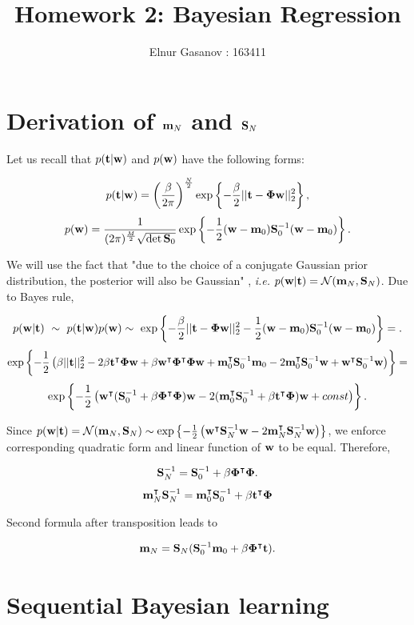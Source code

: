 \documentclass{article}
\author{Elnur Gasanov : 163411}
\title{Homework 2: Bayesian Regression}
\newcommand{\mm}{\bold{m}}
\newcommand{\mS}{\bold{S}}
\newcommand{\mPhi}{\bold{\Phi}}
\newcommand{\mw}{\bold{w}}
\newcommand{\mt}{\bold{t}}
\begin{document}
\maketitle

\section{Derivation of $\mm_N$ and $\mS_N$}

Let us recall that $p (\mt |\mw)$ and $p(\mw)$ have the following forms:

$$
p (\mt |\mw) = \left(\frac{\beta}{2 \pi} \right)^\frac{N}{2} \exp \left\{- \frac\beta2 ||\mt - \mPhi\mw||^2_2 \right\}, 
$$
$$
p(\mw) = \frac{1}{(2\pi)^{\frac{M}{2}} \sqrt{\det \mS_0}} \exp \left\{ -\frac12 (\mw - \mm_0) \mS_0^{-1} (\mw - \mm_0) \right\}.
$$

We will use the fact that "due to the choice of a conjugate Gaussian prior distribution, the posterior will also be Gaussian" \cite{bishop}, \textit{i.e.} $p(\mw |\mt) = \mathcal{N}(\mm_N, \mS_N)$. Due to Bayes rule, 

$$
p(\mw |\mt)~\sim~p(\mt|\mw) p(\mw) \sim \ \exp \left\{- \frac\beta2 ||\mt - \mPhi\mw||^2_2 -\frac12 (\mw - \mm_0) \mS_0^{-1} (\mw - \mm_0) \right\} = .
$$
$$
\exp \left\{ -\frac12 \left(\beta ||\mt||^2_2 - 2 \beta \mt^\intercal \mPhi \mw + \beta \mw^\intercal \mPhi^\intercal \mPhi \mw + \mm_0^\intercal \mS_0^{-1} \mm_0 - 2 \mm_0^\intercal \mS_0^{-1} \mw + \mw^\intercal \mS_0^{-1} \mw \right) \right\} = 
$$
$$
\exp \left\{ -\frac12 \left(  \mw^\intercal (\mS_0^{-1} + \beta \mPhi^\intercal \mPhi) \mw  - 2 (\mm_0^\intercal \mS_0^{-1} + \beta \mt^\intercal \mPhi ) \mw+ const \right) \right\}.
$$

Since $p(\mw |\mt) = \mathcal{N}(\mm_N, \mS_N) \sim \exp \left\{ -\frac{1}{2} \left( \mw^\intercal \mS_N^{-1} \mw - 2 \mm_N^\intercal \mS_N^{-1} \mw \right) \right\}$, we enforce corresponding quadratic form and linear function of $\mw$ to be equal. Therefore,

$$
\mS_N^{-1} = \mS_0^{-1} + \beta \mPhi^\intercal \mPhi.
$$
$$
\mm_N^\intercal \mS_N^{-1} = \mm_0^\intercal \mS_0^{-1} + \beta \mt^\intercal \mPhi 
$$

Second formula after transposition leads to 

$$
\mm_N = \mS_N (\mS_0^{-1} \mm_0 + \beta \mPhi^\intercal \mt).
$$

\section{Sequential Bayesian learning}
\end{document}
